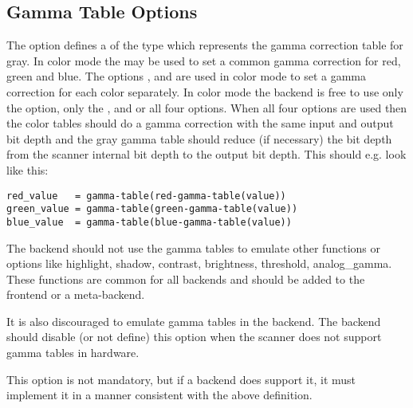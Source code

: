 \documentclass[11pt,DVIps]{report}
\begin{document}
\begin{changebar}
\subsection{Gamma Table Options}
The  option defines a 
of the type  which represents the gamma correction
table for gray.  In color mode the  may be used to set
a common gamma correction for red, green and blue. The options
,  and 
are used in color mode to set a gamma correction for each color
separately. In color mode the backend is free to use only the
 option, only the ,  and
 or all four options. When all four options
are used then the color tables should do a gamma correction with
the same input and output bit depth and the gray gamma table should
reduce (if necessary) the bit depth from the scanner internal
bit depth to the output bit depth. This should e.g. look like this:
\begin{verbatim}
red_value   = gamma-table(red-gamma-table(value))
green_value = gamma-table(green-gamma-table(value))
blue_value  = gamma-table(blue-gamma-table(value))
\end{verbatim}

The backend should not use the gamma tables to emulate other functions or options
like highlight, shadow, contrast, brightness, threshold, analog\_gamma.
These functions are common for all backends and should be added to the frontend
or a meta-backend.

It is also discouraged to emulate gamma tables in the backend. The backend
should disable (or not define) this option when the scanner does not support
gamma tables in hardware.
 
This option is not mandatory, but if a backend does support it, it
must implement it in a manner consistent with the above definition.
\end{changebar}
\end{document}
